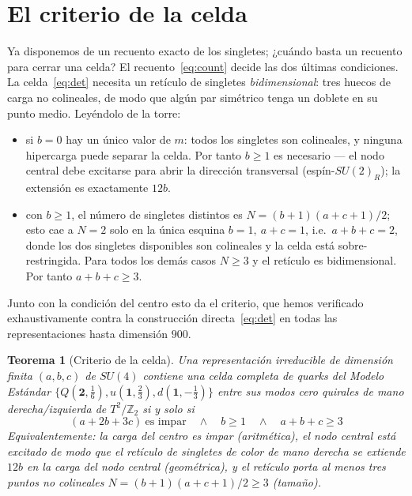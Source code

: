 \documentclass[11pt,a4paper]{article}
\newtheorem{teorema}{Teorema}
\begin{document}
\section{El criterio de la celda}\label{sec:theorem}
Ya disponemos de un recuento exacto de los singletes; ¿cuándo basta un recuento para cerrar una
celda? El recuento~\eqref{eq:count} decide las dos últimas condiciones. La celda~\eqref{eq:det}
necesita un retículo de singletes \emph{bidimensional}: tres huecos de carga no colineales, de
modo que algún par simétrico tenga un doblete en su punto medio. Leyéndolo de la torre:
\begin{itemize}
\item si $b=0$ hay un único valor de $m$: todos los singletes son colineales, y ninguna
hipercarga puede separar la celda. Por tanto $b\ge1$ es necesario --- el nodo central debe
excitarse para abrir la dirección transversal (espín-$SU(2)_R$); la extensión es exactamente
$12b$.
\item con $b\ge1$, el número de singletes distintos es $N=(b+1)(a+c+1)/2$; esto cae a $N=2$
solo en la única esquina $b=1,\ a+c=1$, i.e.\ $a+b+c=2$, donde los dos singletes disponibles
son colineales y la celda está sobre-restringida. Para todos los demás casos $N\ge3$ y el
retículo es bidimensional. Por tanto $a+b+c\ge3$.
\end{itemize}
Junto con la condición del centro esto da el criterio, que hemos verificado exhaustivamente
contra la construcción directa~\eqref{eq:det} en todas las representaciones hasta dimensión
$900$.

\begin{teorema}[Criterio de la celda]\label{thm:cell}
Una representación irreducible de dimensión finita $(a,b,c)$ de $SU(4)$ contiene una celda
completa de quarks del Modelo Estándar
$\{Q(\mathbf 2,\tfrac16),u(\mathbf 1,\tfrac23),d(\mathbf 1,-\tfrac13)\}$ entre sus modos cero
quirales de mano derecha/izquierda de $T^2/\mathbb{Z}_2$ si y solo si
\[
\boxed{\;(a+2b+3c)\ \text{es impar}\quad\wedge\quad b\ge1\quad\wedge\quad a+b+c\ge3\;}
\]
Equivalentemente: la carga del centro es impar (aritmética), el nodo central está excitado de
modo que el retículo de singletes de color de mano derecha se extiende $12b$ en la carga del
nodo central (geométrica), y el retículo porta al menos tres puntos no colineales
$N=(b+1)(a+c+1)/2\ge3$ (tamaño).
\end{teorema}
\end{document}
